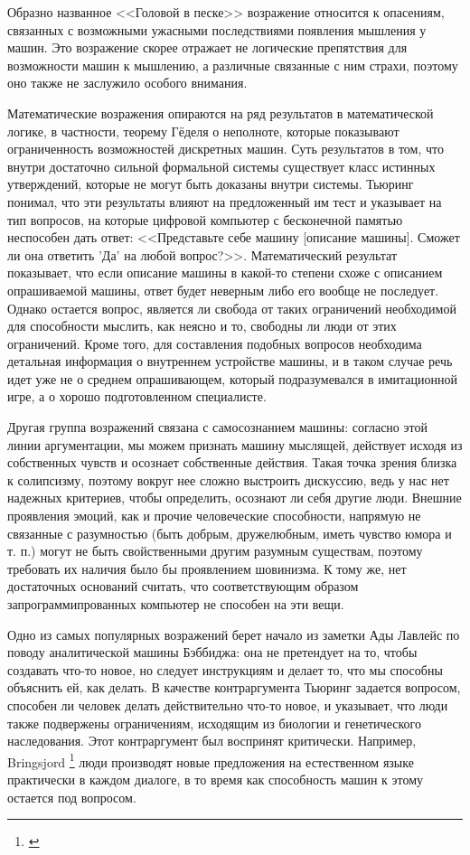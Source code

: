 \documentclass[12pt, specialist, subf, substylefile = spbu.rtx]{disser}
\begin{document}
Образно названное <<Головой в песке>> возражение относится к опасениям, связанных с возможными ужасными последствиями появления мышления у машин. Это возражение скорее отражает не логические препятствия для возможности машин к мышлению, а различные связанные с ним страхи, поэтому оно также не заслужило особого внимания.

Математические возражения опираются на ряд результатов в математической логике, в частности, теорему Гёделя о неполноте, которые показывают ограниченность возможностей дискретных машин. Суть результатов в том, что внутри достаточно сильной формальной системы существует класс истинных утверждений, которые не могут быть доказаны внутри системы. Тьюринг понимал, что эти результаты влияют на предложенный им тест и указывает на тип вопросов, на которые цифровой компьютер с бесконечной памятью неспособен дать ответ: <<Представьте себе машину [описание машины]. Сможет ли она ответить 'Да' на любой вопрос?>>. Математический результат показывает, что если описание машины в какой-то степени схоже с описанием опрашиваемой машины, ответ будет неверным либо его вообще не последует. Однако остается вопрос, является ли свобода от таких ограничений необходимой для способности мыслить, как неясно и то, свободны ли люди от этих ограничений. Кроме того, для составления подобных вопросов необходима детальная информация о внутреннем устройстве машины, и в таком случае речь идет уже не о среднем опрашивающем, который подразумевался в имитационной игре, а о хорошо подготовленном специалисте.

Другая группа возражений связана с самосознанием машины: согласно этой линии аргументации, мы можем признать машину мыслящей, действует исходя из собственных чувств и осознает собственные действия. Такая точка зрения близка к солипсизму, поэтому вокруг нее сложно выстроить дискуссию, ведь у нас нет надежных критериев, чтобы определить, осознают ли себя другие люди. Внешние проявления эмоций, как и прочие человеческие способности, напрямую не связанные с разумностью (быть добрым, дружелюбным, иметь чувство юмора и т. п.) могут не быть свойственными другим разумным существам, поэтому требовать их наличия было бы проявлением шовинизма. К тому же, нет достаточных оснований считать, что соответствующим образом запрограммипрованных компьютер не способен на эти вещи.

Одно из самых популярных возражений берет начало из заметки Ады Лавлейс по поводу аналитической машины Бэббиджа: она не претендует на то, чтобы создавать что-то новое, но следует инструкциям и делает то, что мы способны объяснить ей, как делать. В качестве контраргумента Тьюринг задается вопросом, способен ли человек делать действительно что-то новое, и указывает, что люди также подвержены ограничениям, исходящим из биологии и генетического наследования. Этот контраргумент был воспринят критически. Например, Bringsjord \footnote{\cite{Bringsjord2001-BRICTT-3}} люди производят новые предложения на естественном языке практически в каждом диалоге, в то время как способность машин к этому остается под вопросом.
\end{document}
